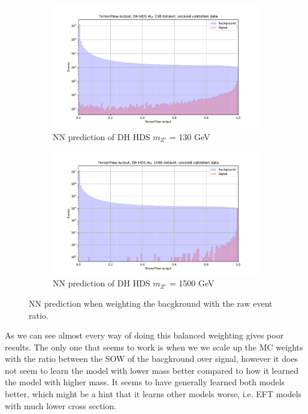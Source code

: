 \documentclass[14pt, a4paper]{book}
\begin{document}
\begin{figure}[!ht]
	\centering
	\begin{subfigure}[b]{0.49\textwidth}
        \centering
        \includegraphics[width=1\textwidth]{DH_HDS_mZp_130/VAL_unscaled.pdf}
        \caption{NN prediction of DH HDS $m_{Z'}$ = 130 GeV}\label{fig:MC_EVT_BKG_DH_HDS_130}
     \end{subfigure}
     \hfill
     \begin{subfigure}[b]{0.49\textwidth}
        \centering
        \includegraphics[width=1\textwidth]{DH_HDS_mZp_1500/VAL_unscaled.pdf}
        \caption{NN prediction of DH HDS $m_{Z'}$ = 1500 GeV}\label{fig:MC_EVT_BKG_DH_HDS_1500}
     \end{subfigure}
     \caption{NN prediction when weighting the bacgkround with the raw event ratio.}\label{fig:MC_EVT_BKG_DH_HDS}
\end{figure}
\clearpage 
As we can see almost every way of doing this balanced weighting gives poor results. The only one that seems to work is when we we scale up the MC weights with the ratio between the SOW of the bacgkround over signal, however it does not seem to learn the model with lower mass better compared to how it learned the model with higher mass. It seems to have generally learned both models better, which might be a hint that it learns other models worse, i.e. EFT models with much lower cross section.\\ 
\end{document}
